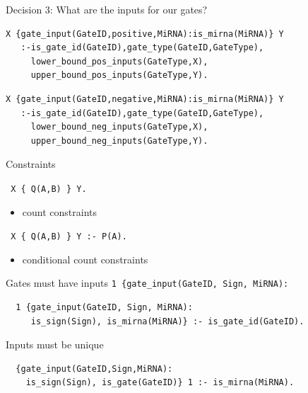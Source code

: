 \documentclass[10pt,dvipsnames]{beamer}
\begin{document}
\begin{frame}[fragile]{Decision 3: What are the inputs for our gates?}
\small
{\color{blue}{\large positive inputs:}}
\begin{verbatim}
X {gate_input(GateID,positive,MiRNA):is_mirna(MiRNA)} Y 
   :-is_gate_id(GateID),gate_type(GateID,GateType),
     lower_bound_pos_inputs(GateType,X), 
     upper_bound_pos_inputs(GateType,Y).
\end{verbatim}

{\color{blue}{\large negative inputs:}}
\begin{verbatim}
X {gate_input(GateID,negative,MiRNA):is_mirna(MiRNA)} Y 
   :-is_gate_id(GateID),gate_type(GateID,GateType),
     lower_bound_neg_inputs(GateType,X),
     upper_bound_neg_inputs(GateType,Y).
\end{verbatim}
\end{frame}



\begin{frame}[fragile]{Constraints}
 \begin{center}
  \texttt{ X \{ Q(A,B) \} Y. }
 \end{center}
 \begin{itemize}
  \item count constraints
 \end{itemize}
 \vspace{1cm}
 \begin{center}
  \texttt{ X \{ Q(A,B) \} Y :- P(A). }
 \end{center}
 \begin{itemize}
  \item conditional count constraints
 \end{itemize}

\end{frame}


\begin{frame}[fragile]{Gates must have inputs}
 \texttt{1 \{gate\_input(GateID, Sign, MiRNA):}
 \begin{verbatim}
  1 {gate_input(GateID, Sign, MiRNA):
     is_sign(Sign), is_mirna(MiRNA)} :- is_gate_id(GateID).
 \end{verbatim}
\end{frame}


\begin{frame}[fragile]{Inputs must be unique}
 \begin{verbatim}
  {gate_input(GateID,Sign,MiRNA):
    is_sign(Sign), is_gate(GateID)} 1 :- is_mirna(MiRNA).
 \end{verbatim}
\end{frame}
\end{document}
